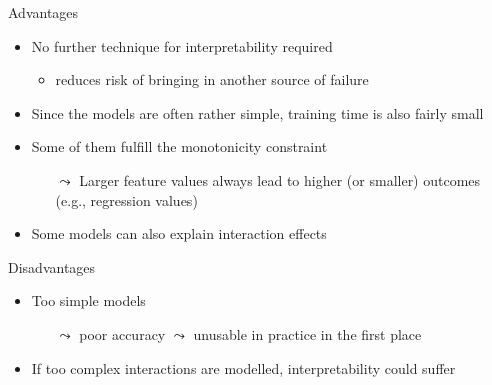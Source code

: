 \documentclass[11pt,compress,t,notes=noshow, xcolor=table]{beamer}
\begin{document}
\begin{vbframe}{Advantages}

    \begin{itemize}
        \item No further technique for interpretability required
        \begin{itemize}
            \item reduces risk of bringing in another source of failure
        \end{itemize}
        
        \medskip
        \item Since the models are often rather simple, training time is also fairly small
        
        \medskip
        \item Some of them fulfill the monotonicity constraint
        \begin{itemize}
            \item[$\leadsto$] Larger feature values always lead to higher (or smaller) outcomes (e.g., regression values)
        \end{itemize}
        
        \medskip
        \item Some models can also explain interaction effects
    \end{itemize}	
	
\end{vbframe}

\begin{vbframe}{Disadvantages}

    \begin{itemize}
        \item Too simple models
        \begin{itemize}
            \item[$\leadsto$] poor accuracy $\leadsto$ unusable in practice in the first place
        \end{itemize}
        
        \medskip
        \item If too complex interactions are modelled, interpretability could suffer
    \end{itemize}	
	
\end{vbframe}
\end{document}
